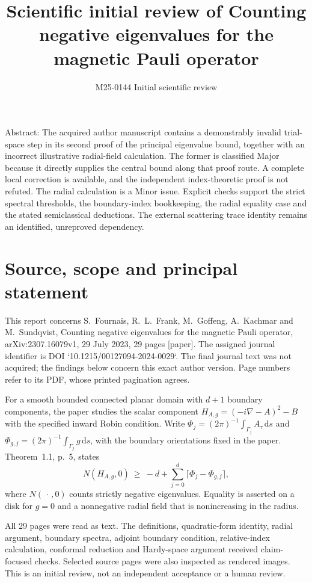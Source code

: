 \documentclass[10pt]{article}
\title{Scientific initial review of
Counting negative eigenvalues for the magnetic Pauli operator}
\author{M25-0144 Initial scientific review}
\date{}
\begin{document}
\maketitle
Abstract: The acquired author manuscript contains a demonstrably invalid trial-space step in its second proof of the principal eigenvalue bound, together with an incorrect illustrative radial-field calculation. The former is classified Major because it directly supplies the central bound along that proof route. A complete local correction is available, and the independent index-theoretic proof is not refuted. The radial calculation is a Minor issue. Explicit checks support the strict spectral thresholds, the boundary-index bookkeeping, the radial equality case and the stated semiclassical deductions. The external scattering trace identity remains an identified, unreproved dependency.\par
\section*{Source, scope and principal statement}
This report concerns S. Fournais, R. L. Frank, M. Goffeng, A. Kachmar and M. Sundqvist, Counting negative eigenvalues for the magnetic Pauli operator, arXiv:2307.16079v1, 29 July 2023, 29 pages [paper]. The assigned journal identifier is DOI `10.1215/00127094-2024-0029`. The final journal text was not acquired; the findings below concern this exact author version. Page numbers refer to its PDF, whose printed pagination agrees.\par
For a smooth bounded connected planar domain with \(d+1\) boundary components, the paper studies the scalar component \(H_{A,g}=(-i\nabla-A)^2-B\) with the specified inward Robin condition. Write \(\Phi_j=(2\pi)^{-1}\int_{\Gamma_j}A_\tau\,\mathrm ds\) and \(\Phi_{g,j}=(2\pi)^{-1}\int_{\Gamma_j}g\,\mathrm ds\), with the boundary orientations fixed in the paper. Theorem 1.1, p. 5, states \[N(H_{A,g},0)\ \geq\ -d+\sum_{j=0}^{d}
          \lceil\Phi_j-\Phi_{g,j}\rceil ,\] where \(N(\,\cdot\,,0)\) counts strictly negative eigenvalues. Equality is asserted on a disk for \(g=0\) and a nonnegative radial field that is nonincreasing in the radius.\par
All 29 pages were read as text. The definitions, quadratic-form identity, radial argument, boundary spectra, adjoint boundary condition, relative-index calculation, conformal reduction and Hardy-space argument received claim-focused checks. Selected source pages were also inspected as rendered images. This is an initial review, not an independent acceptance or a human review.\par
\end{document}
